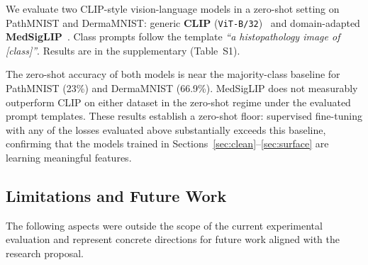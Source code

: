 We evaluate two CLIP-style vision-language models in a zero-shot setting
on PathMNIST and DermaMNIST:
generic \textbf{CLIP} (\texttt{ViT-B/32})~\citep{radford2021} and
domain-adapted \textbf{MedSigLIP}~\citep{ilharco2021}.
Class prompts follow the template \emph{``a histopathology image of [class]''}.
Results are in the supplementary (Table~S1).

The zero-shot accuracy of both models is near the majority-class baseline
for PathMNIST (23\%) and DermaMNIST (66.9\%).
MedSigLIP does not measurably outperform CLIP on either dataset in the
zero-shot regime under the evaluated prompt templates.
These results establish a zero-shot floor: supervised fine-tuning with
any of the losses evaluated above substantially exceeds this baseline,
confirming that the models trained in Sections~\ref{sec:clean}--\ref{sec:surface}
are learning meaningful features.

\subsection{Limitations and Future Work}
\label{sec:limitations}

The following aspects were outside the scope of the current experimental
evaluation and represent concrete directions for future work aligned with
the research proposal.

